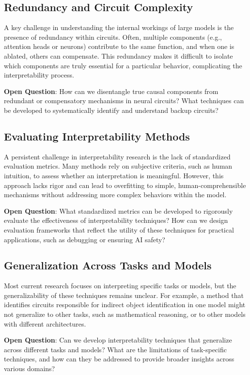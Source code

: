 \documentclass[sigconf,authoryear]{acmart}
\begin{document}
  \subsection{Redundancy and Circuit Complexity}
  A key challenge in understanding the internal workings of large models is the presence of redundancy within circuits. Often, multiple components (e.g., attention heads or neurons) contribute to the same function, and when one is ablated, others can compensate. This redundancy makes it difficult to isolate which components are truly essential for a particular behavior, complicating the interpretability process.
  
  \textbf{Open Question}: How can we disentangle true causal components from redundant or compensatory mechanisms in neural circuits? What techniques can be developed to systematically identify and understand backup circuits?
  
  
  \subsection{Evaluating Interpretability Methods}
  A persistent challenge in interpretability research is the lack of standardized evaluation metrics. Many methods rely on subjective criteria, such as human intuition, to assess whether an interpretation is meaningful. However, this approach lacks rigor and can lead to overfitting to simple, human-comprehensible mechanisms without addressing more complex behaviors within the model.
  
  \textbf{Open Question}: What standardized metrics can be developed to rigorously evaluate the effectiveness of interpretability techniques? How can we design evaluation frameworks that reflect the utility of these techniques for practical applications, such as debugging or ensuring AI safety?
  
  \subsection{Generalization Across Tasks and Models}
  Most current research focuses on interpreting specific tasks or models, but the generalizability of these techniques remains unclear. For example, a method that identifies circuits responsible for indirect object identification in one model might not generalize to other tasks, such as mathematical reasoning, or to other models with different architectures.
  
  \textbf{Open Question}: Can we develop interpretability techniques that generalize across different tasks and models? What are the limitations of task-specific techniques, and how can they be addressed to provide broader insights across various domains?
  
\end{document}
